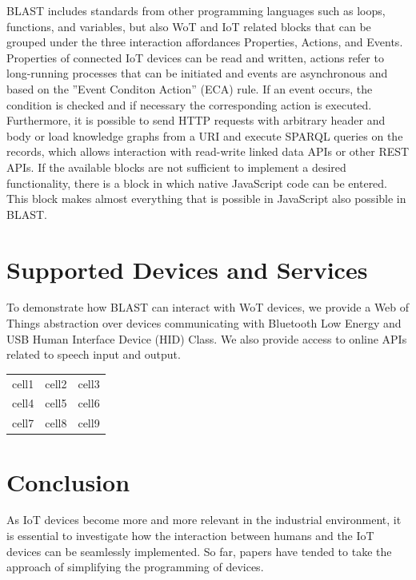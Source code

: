 \documentclass[runningheads]{llncs}
\begin{document}
BLAST includes standards from other programming languages such as loops, functions, and variables, but also WoT and IoT related blocks that can be grouped under the three interaction affordances Properties, Actions, and Events.
Properties of connected IoT devices can be read and written, actions refer to long-running processes that can be initiated and events are asynchronous and based on the ''Event Conditon Action'' (ECA) rule.
If an event occurs, the condition is checked and if necessary the corresponding action is executed.
Furthermore, it is possible to send HTTP requests with arbitrary header and body or load knowledge graphs from a URI and execute SPARQL queries on the records, which allows interaction with read-write linked data APIs or other REST APIs.
If the available blocks are not sufficient to implement a desired functionality, there is a block in which native JavaScript code can be entered.
This block makes almost everything that is possible in JavaScript also possible in BLAST. 

\section{Supported Devices and Services}

To demonstrate how BLAST can interact with WoT devices, we provide a Web of Things abstraction over devices communicating with Bluetooth Low Energy and USB Human Interface Device (HID) Class.
We also provide access to online APIs related to speech input and output.

\begin{center}
\begin{tabular}{ |c|c|c| } 
 \hline
 cell1 & cell2 & cell3 \\ 
 cell4 & cell5 & cell6 \\ 
 cell7 & cell8 & cell9 \\ 
 \hline
\end{tabular}
\end{center}

\section{Conclusion}
As IoT devices become more and more relevant in the industrial environment, it is essential to investigate how the interaction between humans and the IoT devices can be seamlessly implemented.
So far, papers have tended to take the approach of simplifying the programming of devices.
\end{document}
